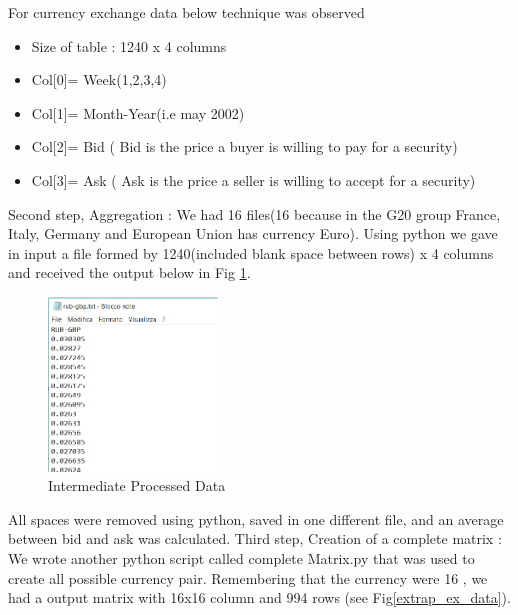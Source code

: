 For currency exchange data below technique was observed
\begin{itemize} 
\item Size of table : 1240 x 4 columns 
\item Col[0]= Week(1,2,3,4) 
\item Col[1]= Month-Year(i.e may 2002) 
\item Col[2]= Bid ( Bid is the price a buyer is willing to pay for a security) 
\item Col[3]= Ask ( Ask is the price a seller is willing to accept for a security) 
\end{itemize}

Second step, Aggregation : We had 16 files(16 because in the G20 group France, Italy, Germany and European Union has currency Euro).  Using python we gave in input a file formed by 1240(included blank space between rows) x 4 columns and received the output below in Fig \ref{part_proccessed}. 
\newline

\begin{figure}[!h]
	\begin{center}
		\includegraphics[width=0.40\textwidth]{aaa1.png}
		\caption{Intermediate Processed Data}
		\label{part_proccessed}
	\end{center}
\end{figure}

All spaces were removed using python,  saved in one different file, and an average between bid and ask was calculated.
\newline
Third step, Creation of a complete matrix : We wrote another python script called complete Matrix.py that was used to create all possible currency pair. Remembering that the currency were 16 , we had a output matrix with 16x16 column and 994 rows (see Fig\ref{extrap_ex_data}).

